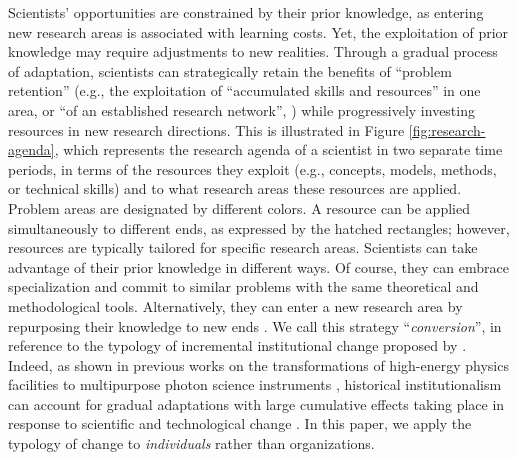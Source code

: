 \documentclass{article}
\begin{document}
Scientists' opportunities are constrained by their prior knowledge, as entering new research areas is associated with learning costs. Yet, the exploitation of prior knowledge may require adjustments to new realities. Through a gradual process of adaptation, scientists can strategically retain  the benefits of ``problem retention'' (e.g., the exploitation of ``accumulated skills and resources'' in one area, or ``of an established research network'', \citealt[p.~106]{Gieryn1978}) while progressively investing resources in new research directions. %
This is illustrated in Figure \ref{fig:research-agenda}, %
which represents the research agenda of a scientist in two separate time periods, in terms of the resources they exploit (e.g., concepts, models, methods, or technical skills) and to what research areas these resources are applied. Problem areas are designated by different colors. A resource can be applied simultaneously to different ends, as expressed by the hatched rectangles; however, resources are typically tailored for specific research areas. Scientists can take advantage of their prior knowledge in different ways. Of course, they can embrace specialization and commit to similar problems with the same theoretical and methodological tools.  
Alternatively, they can enter a new research area by repurposing their knowledge to new ends \citep{Mulkay1974,schon1963displacement}. We call this strategy ``\textit{conversion}'', in reference to the typology of incremental institutional change proposed by \citet{mahoney_thelen_2009}. Indeed, as shown in previous works on the transformations of high-energy physics facilities to multipurpose photon science instruments \citep{Hallonsten2013,Heinze2017a}, historical institutionalism can account for gradual adaptations with large cumulative effects taking place in response to scientific and technological change \citep{Heinze2012}. In this paper, we apply the typology of change to \textit{individuals} rather than organizations. 
\end{document}
